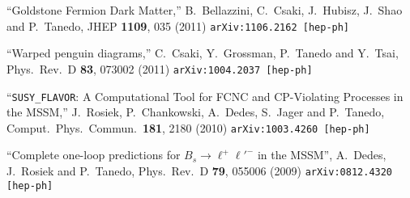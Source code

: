 \documentclass[margin,line]{resume}
\begin{document}
\begin{resume}
\vspace{-2mm}
 
%
 
``Goldstone Fermion Dark Matter,''
  B.~Bellazzini, C.~Csaki, J.~Hubisz, J.~Shao and P.~Tanedo,
  JHEP {\bf 1109}, 035 (2011)
\texttt{arXiv:1106.2162 [hep-ph]} 

\vspace{-2mm}
 
``Warped penguin diagrams,''
  C.~Csaki, Y.~Grossman, P.~Tanedo and Y.~Tsai,
  Phys.\ Rev.\ D {\bf 83}, 073002 (2011)
\texttt{arXiv:1004.2037 [hep-ph]} 

\vspace{-2mm}
 
``\texttt{SUSY\_FLAVOR}: A Computational Tool for FCNC and CP-Violating Processes in the MSSM,''
  J.~Rosiek, P.~Chankowski, A.~Dedes, S.~Jager and P.~Tanedo,
  Comput.\ Phys.\ Commun.\  {\bf 181}, 2180 (2010)
\texttt{arXiv:1003.4260 [hep-ph]} 

\vspace{-2mm}
 
``Complete one-loop predictions for $B_s \rightarrow \ell^+\ell'^-$ in the MSSM'', 
  A.~Dedes, J.~Rosiek and P.~Tanedo,
  Phys.\ Rev.\ D {\bf 79}, 055006 (2009)
\texttt{arXiv:0812.4320 [hep-ph]} 




\vspace{-2mm}



\end{resume}
\end{document}
